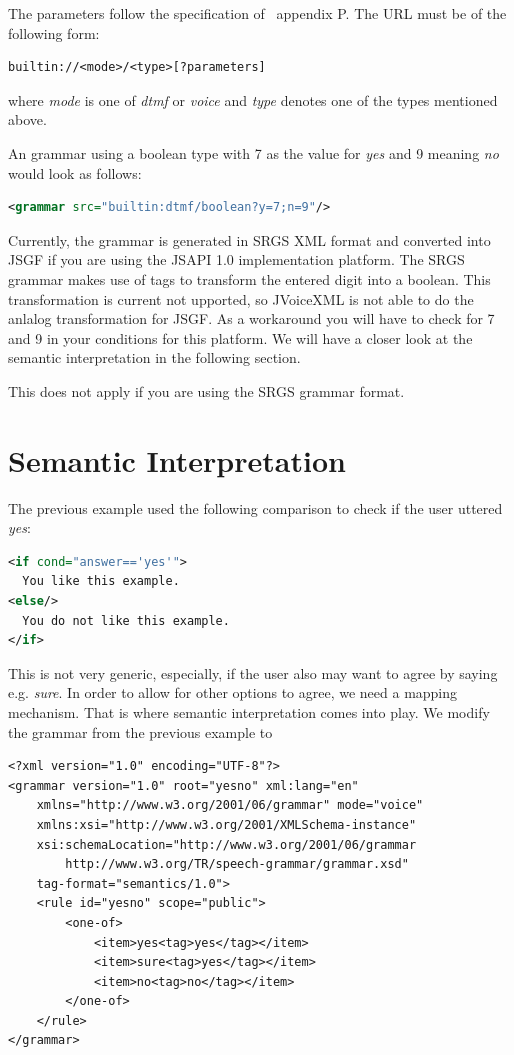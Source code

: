 \documentclass[11pt,a4paper]{book}
\begin{document}
The parameters follow the specification of~\cite{w3.org:voicexml} appendix P.
The URL must be of the following form:

\begin{lstlisting}
builtin://<mode>/<type>[?parameters]
\end{lstlisting}

where \emph{mode} is one of \emph{dtmf} or \emph{voice} and \emph{type} denotes
one of the types mentioned above.

An grammar using a boolean type with 7 as the value for \emph{yes} and 9
meaning \emph{no} would look as follows:

\begin{lstlisting}[language=XML]
<grammar src="builtin:dtmf/boolean?y=7;n=9"/>
\end{lstlisting}

Currently, the grammar is generated in SRGS XML format and converted into JSGF
if you are using the JSAPI 1.0 implementation platform. The SRGS grammar
makes use of tags to transform the entered digit into a boolean. This
transformation is current not upported, so JVoiceXML is not able to do the
anlalog transformation for JSGF. As a workaround you will have to check for 7
and 9 in your conditions for this platform. We will have a closer look at the
semantic interpretation in the following section.

This does not apply if you are using the SRGS grammar format.

\section{Semantic Interpretation}
\label{sec:semantic-interpretation}

The previous example used the following comparison to check if the user uttered
\emph{yes}:

\begin{lstlisting}[language=XML]
<if cond="answer=='yes'">
  You like this example.
<else/>
  You do not like this example.
</if>
\end{lstlisting}

This is not very generic, especially, if the user also may want to agree by
saying e.g. \emph{sure}. In order to allow for other options to agree, we need
a mapping mechanism. That is where semantic interpretation comes into play. We
modify the grammar from the previous example to

\begin{lstlisting}
<?xml version="1.0" encoding="UTF-8"?>
<grammar version="1.0" root="yesno" xml:lang="en"
    xmlns="http://www.w3.org/2001/06/grammar" mode="voice"
    xmlns:xsi="http://www.w3.org/2001/XMLSchema-instance"
    xsi:schemaLocation="http://www.w3.org/2001/06/grammar
        http://www.w3.org/TR/speech-grammar/grammar.xsd"
    tag-format="semantics/1.0">
    <rule id="yesno" scope="public">
        <one-of>
            <item>yes<tag>yes</tag></item>
            <item>sure<tag>yes</tag></item>
            <item>no<tag>no</tag></item>
        </one-of>
    </rule>
</grammar>
\end{lstlisting}
\end{document}
